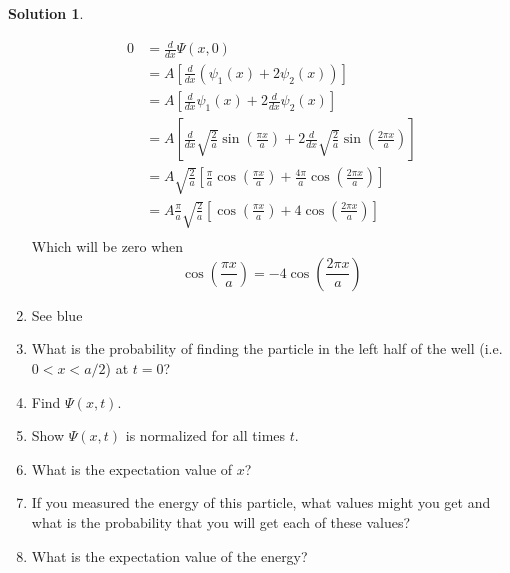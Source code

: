 \documentclass[10pt]{article}
\theoremstyle{definition}
\newtheorem{soln}{Solution}
\begin{document}
\begin{soln}
\begin{enumerate}[label=(\alph*)]
          \begin{align*}
            0 & =\frac{d}{dx}\Psi(x,0)                                                                                                                         \\
              & =A\left[\frac{d}{dx}(\psi_1(x)+2\psi_2(x))\right]                                                                                              \\
              & =A\left[\frac{d}{dx}\psi_1(x)+2\frac{d}{dx}\psi_2(x)\right]                                                                                    \\
              & =A\left[\frac{d}{dx}\sqrt{\frac{2}{a}}\sin\left(\frac{\pi x}{a}\right)+2\frac{d}{dx}\sqrt{\frac{2}{a}}\sin\left(\frac{2\pi x}{a}\right)\right] \\
              & =A\sqrt{\frac{2}{a}}\left[\frac{\pi}{a}\cos\left(\frac{\pi x}{a}\right)+\frac{4\pi}{a}\cos\left(\frac{2\pi x}{a}\right)\right] \\
              & =A\frac{\pi}{a}\sqrt{\frac{2}{a}}\left[\cos\left(\frac{\pi x}{a}\right)+4\cos\left(\frac{2\pi x}{a}\right)\right] \\
          \end{align*}
          Which will be zero when 
          $$\cos\left(\frac{\pi x}{a}\right)=-4\cos\left(\frac{2\pi x}{a}\right)$$
          
    \item See blue
    \item What is the probability of finding the particle in the left half of the well (i.e. $0 < x < a/2$)
          at $t = 0$?
    \item Find $\Psi(x,t)$.
    \item Show $\Psi(x,t)$ is normalized for all times $t$.
    \item What is the expectation value of $x$?
    \item If you measured the energy of this particle, what values might you get and what is the
          probability that you will get each of these values?
    \item What is the expectation value of the energy?
  \end{enumerate}
\end{soln}
\end{document}
